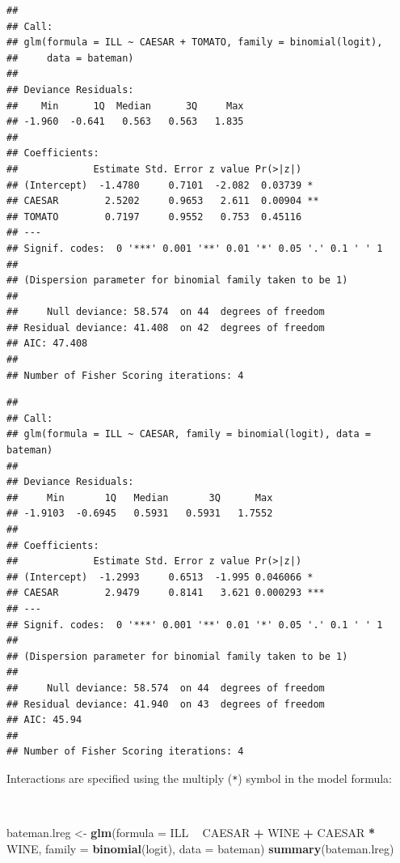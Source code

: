 \documentclass[12pt,a4paper]{book}
\newenvironment{Shaded}{\begin{snugshade}}{\end{snugshade}}
\newcommand{\DataTypeTok}[1]{\textcolor[rgb]{0.13,0.29,0.53}{#1}}
\newcommand{\KeywordTok}[1]{\textcolor[rgb]{0.13,0.29,0.53}{\textbf{#1}}}
\newcommand{\NormalTok}[1]{#1}
\newcommand{\OperatorTok}[1]{\textcolor[rgb]{0.81,0.36,0.00}{\textbf{#1}}}
\newcommand{\StringTok}[1]{\textcolor[rgb]{0.31,0.60,0.02}{#1}}
\theoremstyle{definition}
\theoremstyle{definition}
\theoremstyle{definition}
\theoremstyle{remark}
\begin{document}
\begin{verbatim}
## 
## Call:
## glm(formula = ILL ~ CAESAR + TOMATO, family = binomial(logit), 
##     data = bateman)
## 
## Deviance Residuals: 
##    Min      1Q  Median      3Q     Max  
## -1.960  -0.641   0.563   0.563   1.835  
## 
## Coefficients:
##             Estimate Std. Error z value Pr(>|z|)   
## (Intercept)  -1.4780     0.7101  -2.082  0.03739 * 
## CAESAR        2.5202     0.9653   2.611  0.00904 **
## TOMATO        0.7197     0.9552   0.753  0.45116   
## ---
## Signif. codes:  0 '***' 0.001 '**' 0.01 '*' 0.05 '.' 0.1 ' ' 1
## 
## (Dispersion parameter for binomial family taken to be 1)
## 
##     Null deviance: 58.574  on 44  degrees of freedom
## Residual deviance: 41.408  on 42  degrees of freedom
## AIC: 47.408
## 
## Number of Fisher Scoring iterations: 4
\end{verbatim}

\begin{verbatim}
## 
## Call:
## glm(formula = ILL ~ CAESAR, family = binomial(logit), data = bateman)
## 
## Deviance Residuals: 
##     Min       1Q   Median       3Q      Max  
## -1.9103  -0.6945   0.5931   0.5931   1.7552  
## 
## Coefficients:
##             Estimate Std. Error z value Pr(>|z|)    
## (Intercept)  -1.2993     0.6513  -1.995 0.046066 *  
## CAESAR        2.9479     0.8141   3.621 0.000293 ***
## ---
## Signif. codes:  0 '***' 0.001 '**' 0.01 '*' 0.05 '.' 0.1 ' ' 1
## 
## (Dispersion parameter for binomial family taken to be 1)
## 
##     Null deviance: 58.574  on 44  degrees of freedom
## Residual deviance: 41.940  on 43  degrees of freedom
## AIC: 45.94
## 
## Number of Fisher Scoring iterations: 4
\end{verbatim}

\newpage

Interactions are specified using the multiply (\texttt{*}) symbol in the
model formula:

~

\begin{Shaded}
\begin{Highlighting}[]
\NormalTok{bateman.lreg <-}\StringTok{ }\KeywordTok{glm}\NormalTok{(}\DataTypeTok{formula =}\NormalTok{ ILL }\OperatorTok{~}\StringTok{ }\NormalTok{CAESAR }\OperatorTok{+}\StringTok{ }\NormalTok{WINE }\OperatorTok{+}\StringTok{ }\NormalTok{CAESAR }\OperatorTok{*}\StringTok{ }\NormalTok{WINE,}
                    \DataTypeTok{family =} \KeywordTok{binomial}\NormalTok{(logit), }\DataTypeTok{data =}\NormalTok{ bateman)}
\KeywordTok{summary}\NormalTok{(bateman.lreg)}
\end{Highlighting}
\end{Shaded}
\end{document}
